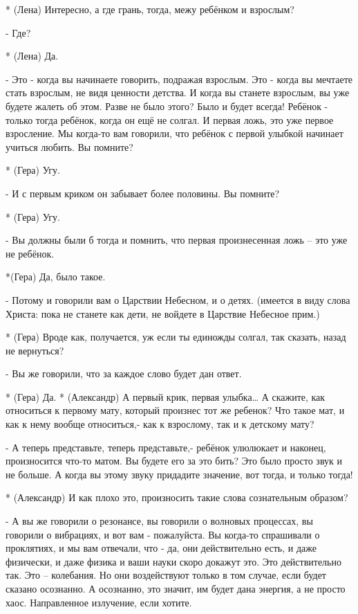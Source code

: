 * (Лена) Интересно, а где грань, тогда, межу ребёнком и взрослым?

- Где?

* (Лена) Да.

- Это - когда вы начинаете говорить, подражая взрослым.  Это - когда вы мечтаете стать взрослым, не видя ценности детства. И когда вы станете взрослым, вы уже будете жалеть об этом. Разве не было этого? Было и будет всегда! Ребёнок - только тогда ребёнок, когда он ещё не солгал. И первая ложь, это уже первое взросление.  Мы когда-то вам говорили, что ребёнок с первой улыбкой начинает учиться любить. Вы помните?

* (Гера) Угу.

- И с первым криком он забывает более половины. Вы помните?

* (Гера) Угу.

- Вы должны были б тогда и помнить, что первая произнесенная ложь – это уже не ребёнок.

*(Гера) Да, было такое.

- Потому и говорили вам о Царствии Небесном, и о детях.  (имеется в виду слова Христа: пока не станете как дети, не войдете в Царствие Небесное прим.)

* (Гера) Вроде как, получается, уж если ты единожды солгал, так сказать, назад не вернуться?

- Вы же говорили, что за каждое слово будет дан ответ.

* (Гера) Да.
* (Александр) А первый крик, первая улыбка… А скажите, как относиться к первому мату, который произнес тот же ребенок? Что такое мат, и как к нему вообще относиться,- как к взрослому, так и к детскому мату?

- А теперь представьте, теперь представьте,- ребёнок улюлюкает и наконец, произносится что-то матом. Вы будете его за это бить? Это было просто звук и не больше. А когда вы этому звуку придадите значение, вот тогда, и только тогда!

* (Александр) И как плохо это, произносить такие слова сознательным образом?

- А вы же говорили о резонансе, вы говорили о волновых процессах, вы говорили о вибрациях, и вот вам - пожалуйста. Вы когда-то спрашивали о проклятиях, и мы вам отвечали, что - да, они действительно есть, и даже физически, и даже физика и ваши науки скоро докажут это. Это действительно так. Это – колебания. Но они воздействуют только в том случае, если будет сказано осознанно. А осознанно, это значит, им будет дана энергия, а не просто хаос. Направленное излучение, если хотите.


